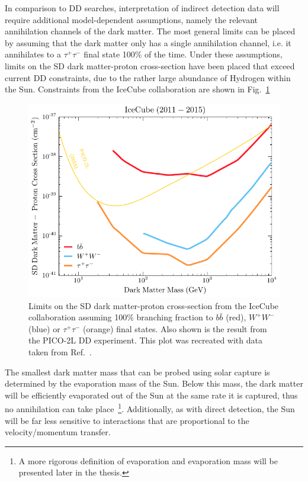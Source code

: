 In comparison to DD searches, interpretation of indirect detection data will require additional model-dependent assumptions, namely the relevant annihilation channels of the dark matter. 
The most general limits can be placed by assuming that the dark matter only has a single annihilation channel, i.e. it annihilates to a $\tau^+\tau^-$ final state 100\% of the time. 
Under these assumptions, limits on the SD dark matter-proton cross-section have been placed that exceed current DD constraints, due to the rather large abundance of Hydrogen within the Sun. Constraints from the IceCube collaboration are shown in Fig.~\ref{fig:IceCube_2016_SD}

\begin{figure}[!t]
    \centering
    \includegraphics{IceCube_2016.pdf}
    \caption{Limits on the SD dark matter-proton cross-section from the IceCube collaboration assuming 100\% branching fraction to $b\bar{b}$ (red), $W^+ W^-$ (blue) or $\tau^+ \tau^-$ (orange) final states. Also shown is the result from the PICO-2L DD experiment. This plot was recreated with data taken from Ref.~\cite{IceCube:2016dgk_mar_Searchannihilatingdark}.}
    \label{fig:IceCube_2016_SD}
\end{figure}

The smallest dark matter mass that can be probed using solar capture is determined by the evaporation mass of the Sun. Below this mass, the dark matter will be efficiently evaporated out of the Sun at the same rate it is captured, thus no annihilation can take place~\footnote{A more rigorous definition of evaporation and evaporation mass will be presented later in the thesis.}.
Additionally, as with direct detection, the Sun will be far less sensitive to interactions that are proportional to the velocity/momentum transfer. 

